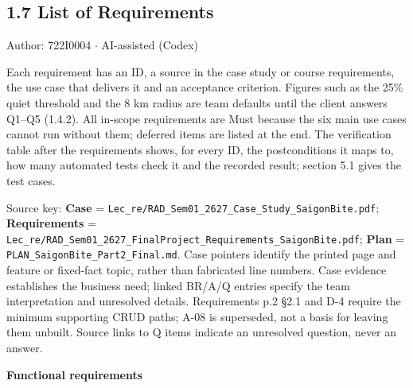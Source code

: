 \subsection*{1.7 List of Requirements}
Author: 722I0004 \ensuremath{\cdot} AI-assisted (Codex)

Each requirement has an ID, a source in the case study or course requirements, the use case that delivers it and an acceptance criterion. Figures such as the 25\% quiet threshold and the 8 km radius are team defaults until the client answers Q1--Q5 (1.4.2). All in-scope requirements are Must because the six main use cases cannot run without them; deferred items are listed at the end. The verification table after the requirements shows, for every ID, the postconditions it maps to, how many automated tests check it and the recorded result; section 5.1 gives the test cases.

Source key: \textbf{Case} = \texttt{Lec\_\allowbreak{}re/\allowbreak{}RAD\_\allowbreak{}Sem01\_\allowbreak{}2627\_\allowbreak{}Case\_\allowbreak{}Study\_\allowbreak{}SaigonBite.\allowbreak{}pdf}; \textbf{Requirements} = \texttt{Lec\_\allowbreak{}re/\allowbreak{}RAD\_\allowbreak{}Sem01\_\allowbreak{}2627\_\allowbreak{}FinalProject\_\allowbreak{}Requirements\_\allowbreak{}SaigonBite.\allowbreak{}pdf}; \textbf{Plan} = \texttt{PLAN\_\allowbreak{}SaigonBite\_\allowbreak{}Part2\_\allowbreak{}Final.\allowbreak{}md}. Case pointers identify the printed page and feature or fixed-fact topic, rather than fabricated line numbers. Case evidence establishes the business need; linked BR/A/Q entries specify the team interpretation and unresolved details. Requirements p.2 \S{}2.1 and D-4 require the minimum supporting CRUD paths; A-08 is superseded, not a basis for leaving them unbuilt. Source links to Q items indicate an unresolved question, never an answer.

\textbf{Functional requirements}

